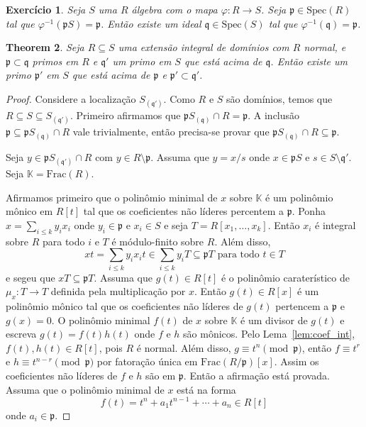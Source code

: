 \documentclass[12pt]{amsart}
\newcommand{\p}{\mathfrak p}
\newcommand{\q}{\mathfrak q}
\newcommand{\K}{\mathbb K}
\newcommand{\fracf}[1]{\mbox{Frac}(#1)}
\newcommand{\spec}[1]{\mbox{Spec}(#1)}
\newtheorem{theorem}{Theorem}
\newtheorem{exercise}[theorem]{Exercício}
\begin{document}
\begin{exercise}\label{ex:prim}
    Seja $S$ uma $R$ álgebra com o mapa $\varphi: R\to S$. Seja $\p\in\spec R$ tal que $\varphi^{-1}(\p S)=\p$. 
    Então existe um ideal $\q\in\spec S$ tal que $\varphi^{-1}(\q)=\p$. 
\end{exercise}

\begin{theorem}
    Seja $R\subseteq S$ uma extensão integral de domínios com $R$ normal, e $\p\subset \q$ primos em $R$ e 
    $\q'$ um primo em $S$ que está acima de $\q$. Então existe um primo $\p'$ em $S$ que está acima de $\p$  
    e $\p'\subset \q'$.  
\end{theorem}
\begin{proof}
    Considere a localização $S_{(\q')}$. Como $R$ e $S$ são domínios, temos que 
    $R\subseteq S\subseteq S_{(\q')}$. 
    Primeiro afirmamos que $\p S_{(\q)}\cap R=\p$. A inclusão $\p\subseteq  \p S_{(\q)}\cap R$ vale trivialmente, 
    então precisa-se provar que $\p S_{(\q)}\cap R\subseteq \p$. 

    Seja $y\in \p S_{(\q')}\cap R$ com $y\in R\setminus \p$. Assuma que $y=x/s$ onde $x\in \p S$ e $s \in S\setminus\q'$. Seja $\K=\fracf R$. 
    
    Afirmamos primeiro que o polinômio minimal de $x$ sobre $\K$ é um polinômio mônico em 
    $R[t]$ tal que os coeficientes não líderes percentem a $\p$. 
    Ponha $x=\sum_{i\leq k} y_ix_i$ onde $y_i\in \p$ e 
    $x_i\in S$  e seja $T=R[x_1,\ldots,x_k]$. Então $x_i$ é integral sobre $R$ para todo $i$ e 
    $T$ é módulo-finito sobre $R$. Além disso, 
    \[
        xt=\sum_{i\leq k}y_ix_it\in \sum_{i\leq k} y_iT\subseteq \p T\mbox{ para todo }t\in T
\]
e segeu que $xT\subseteq \p T$. 
    Assuma que $g(t)\in R[t]$ é o polinômio caraterístico de $\mu_x:T\to T$ definida pela multiplicação 
    por $x$. Então $g(t)\in R[x]$ é um polinômio mônico tal que os coeficientes não líderes de 
    $g(t)$ pertencem a $\p$ e $g(x)=0$.  
    O polinômio minimal $f(t)$ de $x$ sobre $\K$ é um divisor de $g(t)$  e escreva 
    $g(t)=f(t)h(t)$ onde $f$ e $h$ são mônicos. 
    Pelo Lema~\ref{lem:coef_int}, 
    $f(t),h(t)\in R[t]$, 
    pois $R$ é normal. Além disso, $g\equiv t^n\pmod{\p}$, então $f\equiv t^r$ e $h\equiv t^{n-r}\pmod \p$ 
    por fatoração única em $\fracf{R/\p}[x]$. Assim os coeficientes não líderes de $f$ e $h$ são em $\p$. 
    Então a afirmação está provada.
    Assuma que o polinômio minimal de $x$ está na forma 
    \begin{equation}\label{eq:pol_min}
        f(t)=t^n+a_1t^{n-1}+\cdots+a_n\in R[t]
    \end{equation}
    onde $a_i\in \p$. 


\end{proof}
\end{document}
